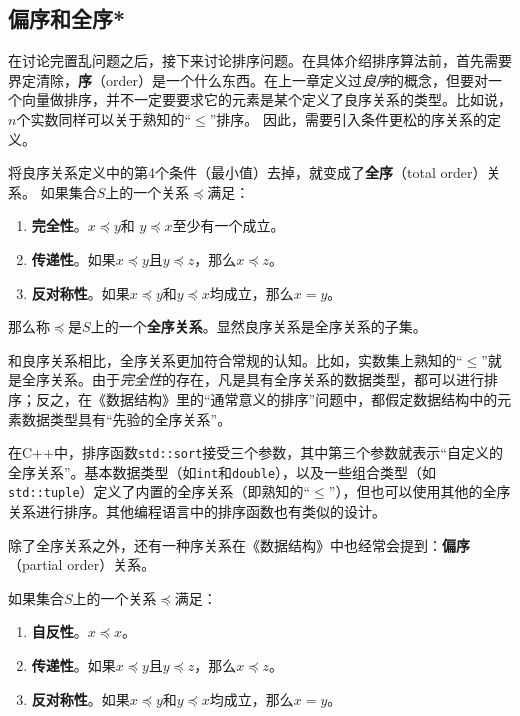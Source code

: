 \subsection{偏序和全序*}
\label{sec:偏序和全序}
在讨论完置乱问题之后，接下来讨论排序问题。在具体介绍排序算法前，首先需要界定清除，\textbf{序}（order）是一个什么东西。在上一章定义过\textit{良序}的概念，但要对一个向量做排序，并不一定要要求它的元素是某个定义了良序关系的类型。比如说，$n$个实数同样可以关于熟知的“$\le$”排序。
因此，需要引入条件更松的序关系的定义。

将良序关系定义中的第4个条件（最小值）去掉，就变成了\textbf{全序}（total order）关系。
如果集合$S$上的一个关系$\preceq$满足：
\begin{enumerate}
    \item \textbf{完全性}。$x \preceq y $和 $y \preceq x$至少有一个成立。
    \item \textbf{传递性}。如果$x \preceq y$且$y \preceq z$，那么$x\preceq z$。
    \item \textbf{反对称性}。如果$x\preceq y$和$y\preceq x$均成立，那么$x=y$。
\end{enumerate}

那么称$\preceq$是$S$上的一个\textbf{全序关系}。显然良序关系是全序关系的子集。

和良序关系相比，全序关系更加符合常规的认知。比如，实数集上熟知的“$\le$”就是全序关系。由于\textit{完全性}的存在，凡是具有全序关系的数据类型，都可以进行排序；反之，在《数据结构》里的“通常意义的排序”问题中，都假定数据结构中的元素数据类型具有“先验的全序关系”。

在C++中，排序函数\lstinline{std::sort}接受三个参数，其中第三个参数就表示“自定义的全序关系”。基本数据类型（如\lstinline{int}和\lstinline{double}），以及一些组合类型（如\lstinline{std::tuple}）定义了内置的全序关系（即熟知的“$\le$”），但也可以使用其他的全序关系进行排序。其他编程语言中的排序函数也有类似的设计。

除了全序关系之外，还有一种序关系在《数据结构》中也经常会提到：\textbf{偏序}（partial order）关系。

如果集合$S$上的一个关系$\preceq$满足：
\begin{enumerate}
    \item \textbf{自反性}。$x \preceq x $。
    \item \textbf{传递性}。如果$x \preceq y$且$y \preceq z$，那么$x\preceq z$。
    \item \textbf{反对称性}。如果$x\preceq y$和$y\preceq x$均成立，那么$x=y$。
\end{enumerate}

